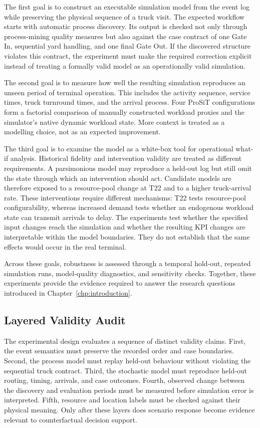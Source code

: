 The first goal is to construct an executable simulation model from the event
log while preserving the physical sequence of a truck visit. The expected
workflow starts with automatic process discovery. Its output is checked not
only through process-mining quality measures but also against the case
contract of one Gate In, sequential yard handling, and one final Gate Out. If
the discovered structure violates this contract, the experiment must make the
required correction explicit instead of treating a formally valid model as an
operationally valid simulation.

The second goal is to measure how well the resulting simulation reproduces an
unseen period of terminal operation. This includes the activity sequence,
service times, truck turnround times, and the arrival process. Four ProSiT
configurations form a factorial comparison of manually constructed workload
proxies and the simulator's native dynamic workload state. More context is
treated as a modelling choice, not as an expected improvement.

The third goal is to examine the model as a white-box tool for operational
what-if analysis. Historical fidelity and intervention validity are treated as
different requirements. A parsimonious model may reproduce a held-out log but
still omit the state through which an intervention should act. Candidate
models are therefore exposed to a resource-pool change at T22 and to a higher
truck-arrival rate. These interventions require different mechanisms: T22
tests resource-pool configurability, whereas increased demand tests whether
an endogenous workload state can transmit arrivals to delay. The experiments
test whether the specified input changes reach the simulation and whether the
resulting KPI changes are interpretable within the model boundaries. They do
not establish that the same effects would occur in the real terminal.

Across these goals, robustness is assessed through a temporal hold-out,
repeated simulation runs, model-quality diagnostics, and sensitivity checks.
Together, these experiments provide the evidence required to answer the
research questions introduced in Chapter~\ref{chp:introduction}.

\subsection{Layered Validity Audit}
\label{sec:layered_validity_audit}

The experimental design evaluates a sequence of distinct validity claims.
First, the event semantics must preserve the recorded order and case
boundaries. Second, the process model must replay held-out behaviour without
violating the sequential truck contract. Third, the stochastic model must
reproduce held-out routing, timing, arrivals, and case outcomes. Fourth,
observed change between the discovery and evaluation periods must be measured
before simulation error is interpreted. Fifth, resource and location labels
must be checked against their physical meaning. Only after these layers does
scenario response become evidence relevant to counterfactual decision support.

